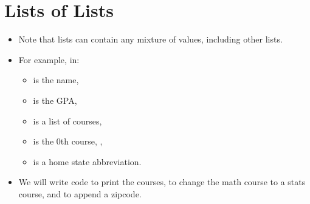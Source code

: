 \documentclass[letterpaper,10pt,english]{sphinxmanual}
\begin{document}
\section{Lists of Lists}
\label{\detokenize{lecture_notes/lec08_lists1:lists-of-lists}}\begin{itemize}
\item {} 
Note that lists can contain any mixture of values, including other lists.

\item {} 
For example, in:

\begin{sphinxVerbatim}[commandchars=\\\{\}]
  \PYG{p}{[}  \PYG{p}{[}  \PYG{p}{]} \PYG{p}{]}
\end{sphinxVerbatim}
\begin{itemize}
\item {} 
 is the name,

\item {} 
 is the GPA,

\item {} 
 is a list of courses,

\item {} 
 is the 0th course, ,

\item {} 
 is a home state abbreviation.

\end{itemize}

\item {} 
We will write code to print the courses, to change the math course to
a stats course, and to append a zipcode.

\end{itemize}
\end{document}
